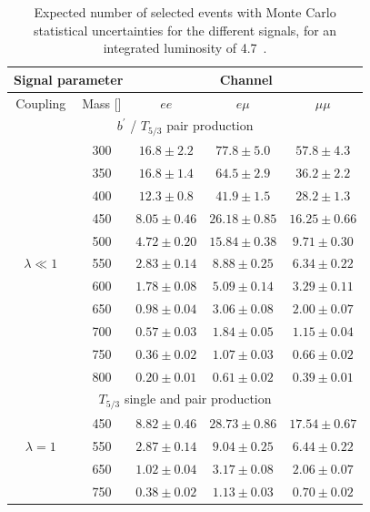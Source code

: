 \begin{table}[p]
  \begin{center}
    \caption{Expected number of selected events with Monte Carlo statistical uncertainties 
      for the different signals, for an integrated luminosity of 4.7~\ifb{}.}\label{yieldsignal}
    \begin{tabular}{c|c|c|c|c}
      \hline\hline
      \multicolumn{2}{c|}{Signal parameter}  & \multicolumn{3}{c}{Channel} \\
      \hline
      Coupling& Mass [\GeV{}]      & $ee$ & $e\mu$ & $\mu\mu$ \\ 
      \hline
      \multicolumn{5}{c}{$b^\prime$ / $T_{5/3}$ pair production} \\
      \hline
      & 300 & $16.8 \pm 2.2$   & $77.8 \pm 5.0$   & $57.8 \pm 4.3$     \\ 
      & 350 & $16.8 \pm 1.4$   & $64.5 \pm 2.9$   & $36.2 \pm 2.2$     \\ 
      & 400 & $12.3 \pm 0.8$   & $41.9 \pm 1.5$   & $28.2 \pm 1.3$     \\ 
      & 450 & $8.05 \pm 0.46$   & $26.18 \pm 0.85$   & $16.25 \pm 0.66$     \\ 
      & 500 & $4.72 \pm 0.20$   & $15.84 \pm 0.38$   & $9.71 \pm 0.30$     \\ 
      $\lambda\ll1$ & 550 & $2.83 \pm 0.14$   & $8.88 \pm 0.25$   & $6.34 \pm 0.22$     \\ 
      & 600 & $1.78 \pm 0.08$   & $5.09 \pm 0.14$   & $3.29 \pm 0.11$     \\ 
      & 650 & $0.98 \pm 0.04$   & $3.06 \pm 0.08$   & $2.00 \pm 0.07$     \\ 
      & 700 & $0.57 \pm 0.03$   & $1.84 \pm 0.05$   & $1.15 \pm 0.04$     \\ 
      & 750 & $0.36 \pm 0.02$   & $1.07 \pm 0.03$   & $0.66 \pm 0.02$     \\ 
      & 800 & $0.20 \pm 0.01$   & $0.61 \pm 0.02$   & $0.39 \pm 0.01$     \\ 
      \hline
      \multicolumn{5}{c}{$T_{5/3}$ single and pair production} \\
      \hline
      & 450 & $8.82 \pm 0.46$ & $28.73 \pm 0.86$ & $17.54 \pm 0.67$ \\
      $\lambda=1$ & 550 & $2.87 \pm 0.14$ & $9.04  \pm 0.25$ & $6.44  \pm 0.22$ \\
      & 650 & $1.02 \pm 0.04$ & $3.17  \pm 0.08$ & $2.06  \pm 0.07$ \\
      & 750 & $0.38 \pm 0.02$ & $1.13  \pm 0.03$ & $0.70  \pm 0.02$ \\

\end{tabular}
\end{center}
\end{table}
